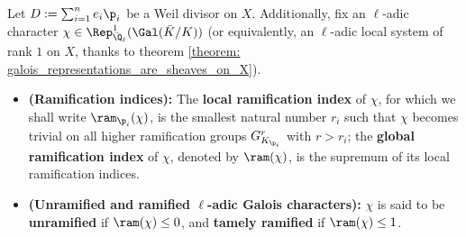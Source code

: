     \begin{definition} \label{def: (un)ramified_galois_characters}
            Let $D := \sum_{i = 1}^n e_i \p_i$ be a Weil divisor on $X$. Additionally, fix an $\ell$-adic character $\chi \in \Rep^1_{\bar{\Q}_{\ell}}(\Gal(\bar{K}/K))$ (or equivalently, an $\ell$-adic local system of rank $1$ on $X$, thanks to theorem \ref{theorem: galois_representations_are_sheaves_on_X}).
                \begin{itemize}
                    \item \textbf{(Ramification indices):} The \textbf{local ramification index} of $\chi$, for which we shall write $\ram_{\p_i}(\chi)$, is the smallest natural number $r_i$ such that $\chi$ becomes trivial on all higher ramification groups $G_{K_{\p_i}}^{r}$ with $r > r_i$; the \textbf{global ramification index} of $\chi$, denoted by $\ram(\chi)$, is the supremum of its local ramification indices. 
                    \item \textbf{(Unramified and ramified $\ell$-adic Galois characters):} $\chi$ is said to be \textbf{unramified} if $\ram(\chi) \leq 0$, and \textbf{tamely ramified} if $\ram(\chi) \leq 1$.
                \end{itemize}
        \end{definition}